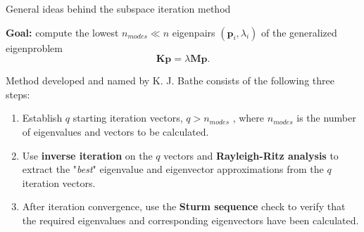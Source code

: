 \documentclass[aspectratio=169]{beamer}
\begin{document}
\begin{frame}{General ideas behind the subspace iteration method}
  \vspace{-0.2cm}
  \begin{block}{}
    \textbf{Goal:} compute the lowest \( n_{modes} \ll n \) eigenpairs \( (\mathbf p_i, \lambda_i) \) of the generalized eigenproblem
    $$\mathbf K\mathbf p = \lambda\mathbf M \mathbf p.$$
  \end{block}
  Method developed and named by K. J. Bathe consists of the following three steps:
  \begin{enumerate}
    \item Establish $q$ starting iteration vectors, $q> n_{modes}$ , where $n_{modes}$ is the number of eigenvalues and vectors to be calculated.
    \item Use \textbf{inverse iteration} on the $q$ vectors and \textbf{Rayleigh-Ritz analysis} to extract the "\emph{best}" eigenvalue and eigenvector approximations from the $q$ iteration vectors.
    \item After iteration convergence, use the \textbf{Sturm sequence} check to verify that the required eigenvalues and corresponding eigenvectors have been calculated.
  \end{enumerate}
\end{frame}
\end{document}
